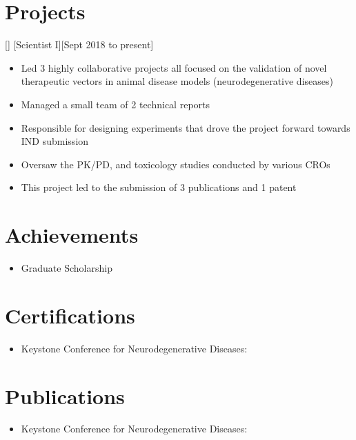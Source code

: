 \documentclass{article}
\begin{document}
    \section{Projects}

    []
    [Scientist I][Sept 2018 to present]

    \begin{itemize}
        \item Led 3 highly collaborative projects all focused on the validation of novel therapeutic vectors in animal disease models (neurodegenerative diseases)
        \item Managed a small team of 2 technical reports
        \item Responsible for designing experiments that drove the project forward towards IND submission
        \item Oversaw the PK/PD, and toxicology studies conducted by various CROs
        \item This project led to the submission of 3 publications and 1 patent
    \end{itemize}

    \section{Achievements}
    \begin{itemize}
        \item Graduate Scholarship
    \end{itemize}

    \section{Certifications}

    \begin{itemize}
        \item Keystone Conference for Neurodegenerative Diseases:
    \end{itemize}


    \section{Publications}

    \begin{itemize}
        \item Keystone Conference for Neurodegenerative Diseases:
    \end{itemize}
\end{document}
